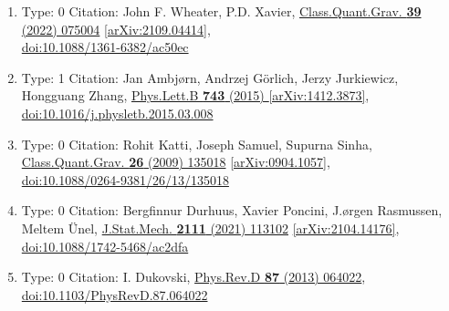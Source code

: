\documentclass[a4paper,10pt]{article}
\begin{document}
\begin{enumerate}
\begin{enumerate}
  \item Type: 0 Citation: John F. Wheater, P.D. Xavier, \href{https://www.doi.org/10.1088/1361-6382/ac50ec}{Class.Quant.Grav. {\bf 39} (2022) 075004}  \href{https://arxiv.org/abs/2109.04414}{[arXiv:2109.04414]},\\\href{https://www.doi.org/10.1088/1361-6382/ac50ec}{doi:10.1088/1361-6382/ac50ec}
  \item Type: 1 Citation: Jan Ambjørn, Andrzej Görlich, Jerzy Jurkiewicz, Hongguang Zhang, \href{https://www.doi.org/10.1016/j.physletb.2015.03.008}{Phys.Lett.B {\bf 743} (2015) }  \href{https://arxiv.org/abs/1412.3873}{[arXiv:1412.3873]},\\\href{https://www.doi.org/10.1016/j.physletb.2015.03.008}{doi:10.1016/j.physletb.2015.03.008}
  \item Type: 0 Citation: Rohit Katti, Joseph Samuel, Supurna Sinha, \href{https://www.doi.org/10.1088/0264-9381/26/13/135018}{Class.Quant.Grav. {\bf 26} (2009) 135018}  \href{https://arxiv.org/abs/0904.1057}{[arXiv:0904.1057]},\\\href{https://www.doi.org/10.1088/0264-9381/26/13/135018}{doi:10.1088/0264-9381/26/13/135018}
  \item Type: 0 Citation: Bergfinnur Durhuus, Xavier Poncini, J.ørgen Rasmussen, Meltem Ünel, \href{https://www.doi.org/10.1088/1742-5468/ac2dfa}{J.Stat.Mech. {\bf 2111} (2021) 113102}  \href{https://arxiv.org/abs/2104.14176}{[arXiv:2104.14176]},\\\href{https://www.doi.org/10.1088/1742-5468/ac2dfa}{doi:10.1088/1742-5468/ac2dfa}
  \item Type: 0 Citation: I. Dukovski, \href{https://www.doi.org/10.1103/PhysRevD.87.064022}{Phys.Rev.D {\bf 87} (2013) 064022},\\\href{https://www.doi.org/10.1103/PhysRevD.87.064022}{doi:10.1103/PhysRevD.87.064022}

\end{enumerate}
\end{enumerate}
\end{document}
